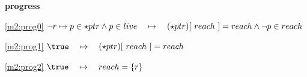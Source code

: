 \textbf{progress}
\begin{block}
\item[ \eqref{m2:prog0} ]{$\neg r \mapsto p \in \star ptr  %
			\land p \in live  \quad \mapsto\quad \lookup{(\star ptr)}{~reach~} = reach  %
			\land \neg p \in reach  $} %
\item[ \eqref{m2:prog1} ]{$\true  \quad \mapsto\quad \lookup{(\star ptr)}{~reach~} = reach $} %
\item[ \eqref{m2:prog2} ]{$\true  \quad \mapsto\quad reach = \{ r \} $} %
\end{block}
